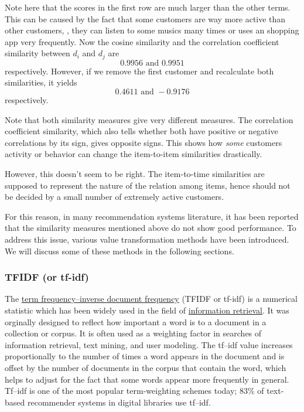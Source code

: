 Note here that the scores in the first row are much larger than the other terms.
This can be caused by the fact that some customers are way more active than other customers,
\eg, they can listen to some musics many times or uses an shopping app very frequently.
Now the cosine similarity and the correlation coefficient similarity between $d_i$ and $d_j$
are
\begin{equation}
0.9956 \mbox{ and } 0.9951
\end{equation}
respectively.
However, if we remove the first customer and recalculate both similarities,
it yields
\begin{equation}
0.4611 \mbox{ and } -0.9176
\end{equation}
respectively.

Note that both similarity measures give very different measures.
The correlation coefficient similarity, which also tells whether both have positive or negative correlations
by its sign, gives opposite signs.
This shows how \emph{some} customers activity or behavior can change the item-to-item similarities drastically.

However, this doesn't seem to be right.
The item-to-time similarities are supposed to represent the nature of the relation among items,
hence should not be decided by a small number of extremely active customers.

For this reason, in many recommendation systems literature,
it has been reported that the similarity measures mentioned above do not show good performance.
To address this issue,
various value transformation methods have been introduced.
We will discuss some of these methods in the following sections.

\subsubsection{TFIDF (or tf-idf)}

The \href{https://en.wikipedia.org/wiki/Tf-idf}{term frequency–inverse document frequency} (TFIDF or tf-idf)
is a numerical statistic which has been widely used in the field of
\href{https://en.wikipedia.org/wiki/Information_retrieval}{information retrieval}.
It was orginally designed to reflect how important a word is to a document in a collection or corpus.
It is often used as a weighting factor in searches of information retrieval,
text mining, and user modeling.
The tf–idf value increases proportionally to the number of times a word appears in the document
and is offset by the number of documents in the corpus that contain the word,
which helps to adjust for the fact that some words appear more frequently in general.
Tf–idf is one of the most popular term-weighting schemes today;
83\% of text-based recommender systems in digital libraries use tf–idf.

